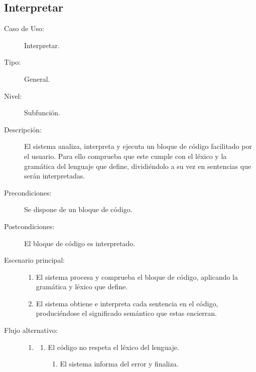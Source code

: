 \subsection{Interpretar}
\begin{framed}
\FloatBarrier
\begin{description}
   \item[Caso de Uso:]  Interpretar.
   \item[Tipo:] General.
   \item[Nivel:]  Subfunción.
   \item[Descripción:] 
   El sistema analiza, interpreta y ejecuta un bloque de código facilitado por el usuario.
   Para ello comprueba que este cumple con el léxico y la gramática del lenguaje 
   que define, dividiéndolo a su vez en sentencias que serán interpretadas. 
   \item[Precondiciones:] 
   Se dispone de un bloque de código.
   \item[Postcondiciones:] 
   El bloque de código es interpretado.
   \item[Escenario principal:] \hfill
   \begin{enumerate}
   \item El sistema procesa y comprueba el bloque de código, aplicando
   la gramática y léxico que define.
   \item El sistema obtiene e interpreta cada sentencia en el código, produciéndose
   el significado semántico que estas encierran.
   \end{enumerate}
   \item[Flujo alternativo:] \hfill 
   \begin{enumerate} \itemsep1pt \parskip0pt 
   \setcounter{enumi}{0}
   \renewcommand{\labelenumi}{}
   \renewcommand{\labelenumiii}{\arabic{enumiii}.}
   \renewcommand{\labelenumii}{\arabic{enumi}\alph{enumii}.}
      \item 
      \begin {enumerate}
         \setcounter{enumii}{0}
         \item El código no respeta el léxico del lenguaje.
         \begin{enumerate}
         \item El sistema informa del error y finaliza.

\end{enumerate}
\end{enumerate}
\end{enumerate}
\end{description}
\end{framed}
